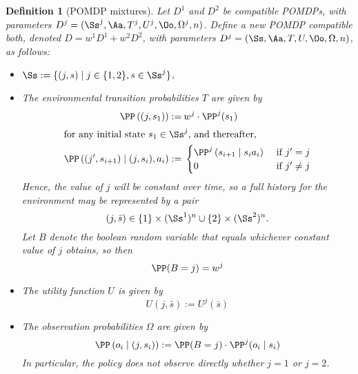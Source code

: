 \documentclass{article}  %
\newcommand{\seq}{\bar}
\newcommand{\bool}{B}
\newtheorem{definition}[theorem]{Definition}
\begin{document}
\begin{definition}[POMDP mixtures]\label{defn:mixture} Let $D^1$ and $D^2$ be compatible POMDPs, with parameters 
$D^j = (\Ss^j,\Aa,T^j, U^j, \Oo, \Omega^j, n)$.  Define a new POMDP compatible both, denoted $D=w^1D^1 + w^2D^2$, with parameters 
$D^j = (\Ss,\Aa,T, U, \Oo, \Omega, n)$, as follows:
\begin{itemize}
\item $\Ss:= \{(j,s) \mid j\in\{1,2\}, s\in\Ss^j\}$,
\item The environmental transition probabilities $T$ are given by
\begin{align*}
\PP\left((j,s_1)\right) :=&\: w^j\cdot \PP^j(s_1)\\
\intertext{for any initial state $s_1\in\Ss^j$, and thereafter,}
\PP\left((j',s_{i+1}) \mid (j,s_i), a_i \right) :=&\;
\begin{cases}
\PP^j\left(s_{i+1} \mid s_ia_i\right) &\mbox{ if $j'=j$}\\
0 & \mbox { if $j'\neq j$}
\end{cases}
\end{align*}
Hence, the value of $j$ will be constant over time, so a full history for the environment may be represented by a pair
\[
(j,\seq s) \in \{1\}\times (\Ss^1)^n \cup \{2\}\times(\Ss^2)^n.
\]
Let $\bool $ denote the boolean random variable that equals whichever constant value of $j$ obtains, so then
\[
\PP(\bool =j) = w^j
\]
\item The utility function $U$ is given by
\[
U(j,\seq s) := U^j(\seq s)
\]
\item The observation probabilities $\Omega$ are given by
\[
\PP\left(o_i \mid (j,s_i)\right) := \PP(\bool =j) \cdot \PP^j(o_i \mid s_i)
\]
In particular, the policy does not observe directly whether $j=1$ or $j=2$.
\end{itemize}

\end{definition}
\end{document}
